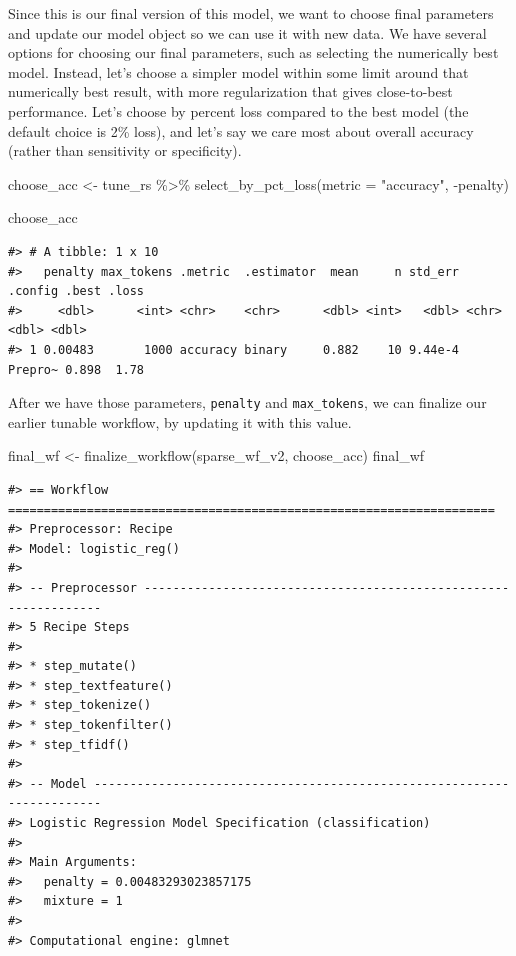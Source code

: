 \documentclass[
]{krantz}
\makeatletter
\newenvironment{Shaded}{\begin{snugshade}}{\end{snugshade}}
\newcommand{\AttributeTok}[1]{\textcolor[rgb]{0.77,0.63,0.00}{#1}}
\newcommand{\FunctionTok}[1]{\textcolor[rgb]{0.00,0.00,0.00}{#1}}
\newcommand{\NormalTok}[1]{#1}
\newcommand{\OtherTok}[1]{\textcolor[rgb]{0.56,0.35,0.01}{#1}}
\newcommand{\SpecialCharTok}[1]{\textcolor[rgb]{0.00,0.00,0.00}{#1}}
\newcommand{\StringTok}[1]{\textcolor[rgb]{0.31,0.60,0.02}{#1}}
\newenvironment{kframe}{%
\medskip{}
\setlength{\fboxsep}{.8em}
 \def\at@end@of@kframe{}%
 \ifinner\ifhmode%
  \def\at@end@of@kframe{\end{minipage}}%
  \begin{minipage}{\columnwidth}%
 \fi\fi%
 \def\FrameCommand##1{\hskip\@totalleftmargin \hskip-\fboxsep
 \colorbox{shadecolor}{##1}\hskip-\fboxsep
     \hskip-\linewidth \hskip-\@totalleftmargin \hskip\columnwidth}%
 \MakeFramed {\advance\hsize-\width
   \@totalleftmargin\z@ \linewidth\hsize
   \@setminipage}}%
 {\par\unskip\endMakeFramed%
 \at@end@of@kframe}
\renewenvironment{Shaded}{\begin{kframe}}{\end{kframe}}
\makeatother
\begin{document}
Since this is our final version of this model, we want to choose final parameters and update our model object so we can use it with new data. We have several options for choosing our final parameters, such as selecting the numerically best model. Instead, let's choose a simpler model within some limit around that numerically best result, with more regularization that gives close-to-best performance. Let's choose by percent loss compared to the best model (the default choice is 2\% loss), and let's say we care most about overall accuracy (rather than sensitivity or specificity).

\begin{Shaded}
\begin{Highlighting}[]
\NormalTok{choose\_acc }\OtherTok{\textless{}{-}}\NormalTok{ tune\_rs }\SpecialCharTok{\%\textgreater{}\%}
  \FunctionTok{select\_by\_pct\_loss}\NormalTok{(}\AttributeTok{metric =} \StringTok{"accuracy"}\NormalTok{, }\SpecialCharTok{{-}}\NormalTok{penalty)}

\NormalTok{choose\_acc}
\end{Highlighting}
\end{Shaded}

\begin{verbatim}
#> # A tibble: 1 x 10
#>   penalty max_tokens .metric  .estimator  mean     n std_err .config .best .loss
#>     <dbl>      <int> <chr>    <chr>      <dbl> <int>   <dbl> <chr>   <dbl> <dbl>
#> 1 0.00483       1000 accuracy binary     0.882    10 9.44e-4 Prepro~ 0.898  1.78
\end{verbatim}

After we have those parameters, \texttt{penalty} and \texttt{max\_tokens}, we can finalize our earlier tunable workflow, by updating it with this value.

\begin{Shaded}
\begin{Highlighting}[]
\NormalTok{final\_wf }\OtherTok{\textless{}{-}} \FunctionTok{finalize\_workflow}\NormalTok{(sparse\_wf\_v2, choose\_acc)}
\NormalTok{final\_wf}
\end{Highlighting}
\end{Shaded}

\begin{verbatim}
#> == Workflow ====================================================================
#> Preprocessor: Recipe
#> Model: logistic_reg()
#> 
#> -- Preprocessor ----------------------------------------------------------------
#> 5 Recipe Steps
#> 
#> * step_mutate()
#> * step_textfeature()
#> * step_tokenize()
#> * step_tokenfilter()
#> * step_tfidf()
#> 
#> -- Model -----------------------------------------------------------------------
#> Logistic Regression Model Specification (classification)
#> 
#> Main Arguments:
#>   penalty = 0.00483293023857175
#>   mixture = 1
#> 
#> Computational engine: glmnet
\end{verbatim}
\end{document}
